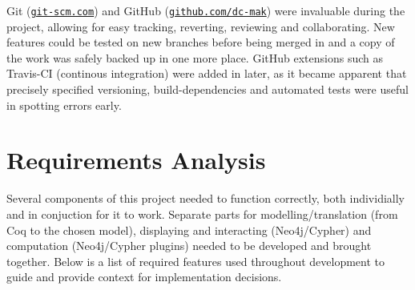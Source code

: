 Git (\href{http://git-scm.com}{\texttt{git-scm.com}}) and GitHub
(\href{http://github.com/dc-mak}{\texttt{github.com/dc-mak}}) were invaluable during the
project, allowing for easy tracking, reverting, reviewing and collaborating.
New features could be tested on new branches before being merged in and a copy
of the work was safely backed up in one more place. GitHub extensions such as
Travis-CI (continous integration) were added in later, as it became apparent
that precisely specified versioning, build-dependencies and automated tests were
useful in spotting errors early.

\section{Requirements Analysis}
Several components of this project needed to function correctly, both
individially and in conjuction for it to work. Separate parts for
modelling/translation (from Coq to the chosen model), displaying and
interacting (Neo4j/Cypher) and computation (Neo4j/Cypher plugins)
needed to be developed and brought together. Below is a list of required
features used throughout development to guide and provide context for
implementation decisions.

